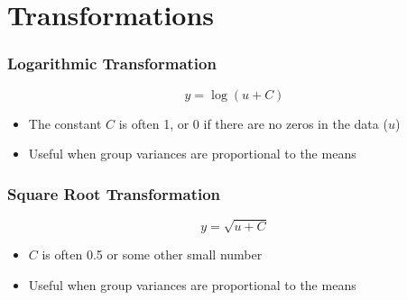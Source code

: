 \documentclass[color=usenames,dvipsnames]{beamer}\usepackage[]{graphicx}\usepackage[]{color}
\begin{document}
\section{Transformations}








\begin{frame}
  \frametitle{Logarithmic Transformation}
  \LARGE
  \[
  y = \log(u + C)
  \]
  \large
  \begin{itemize}%
    \item The constant $C$ is often 1, or 0 if there are no zeros in the data ($u$)
    \item Useful when group variances are proportional to the means
  \end{itemize}
\end{frame}






\begin{frame}
  \frametitle{Square Root Transformation}
  \LARGE
  \[
  y = \sqrt{u + C}
  \]
  \large
  \begin{itemize}%
    \item $C$ is often 0.5 or some other small number
    \item Useful when group variances are proportional to the means
  \end{itemize}
\end{frame}



\end{document}

